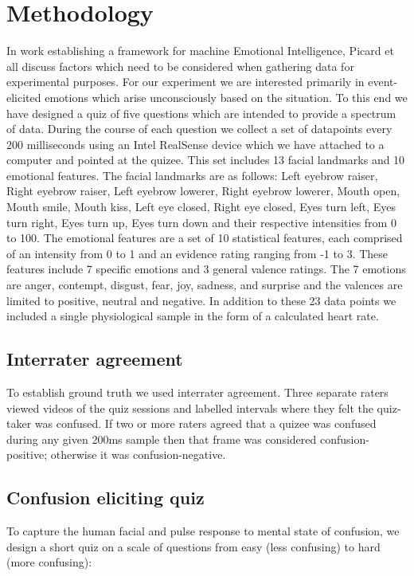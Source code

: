\documentclass[12pt,letterpaper]{article}
\begin{document}
\section{Methodology}
In work establishing a framework for machine Emotional Intelligence, Picard et all \cite{picard2001toward} discuss factors which need to be considered when gathering data for experimental purposes.  For our experiment we are interested primarily in event-elicited emotions which arise unconsciously based on the situation.  To this end we have designed a quiz of five questions which are intended to provide a spectrum of data.  During the course of each question we collect a set of datapoints every 200 milliseconds using an Intel RealSense device which we have attached to a computer and pointed at the quizee.  This set includes 13 facial landmarks and 10 emotional features.  The facial landmarks are as follows: Left eyebrow raiser, Right eyebrow raiser, Left eyebrow lowerer, Right eyebrow lowerer, Mouth open, Mouth smile, Mouth kiss, Left eye closed, Right eye closed, Eyes turn left, Eyes turn right, Eyes turn up, Eyes turn down and their respective intensities from 0 to 100.  The emotional features are a set of 10 statistical features, each comprised of an intensity from 0 to 1 and an evidence rating ranging from -1 to 3.  These features include 7 specific emotions and 3 general valence ratings.  The 7 emotions are anger, contempt, disgust, fear, joy, sadness, and surprise and the valences are limited to positive, neutral and negative.  In addition to these 23 data points we included a single physiological sample in the form of a calculated heart rate.

\subsection{Interrater agreement}
To establish ground truth we used interrater agreement.  Three separate raters viewed videos of the quiz sessions and labelled intervals where they felt the quiz-taker was confused.  If two or more raters agreed that a quizee was confused during any given 200ms sample then that frame was considered confusion-positive; otherwise it was confusion-negative.

\subsection{Confusion eliciting quiz}

To capture the human facial and pulse response to mental state of confusion, we design a short quiz on a scale of questions from easy (less confusing) to hard (more confusing):
\end{document}
